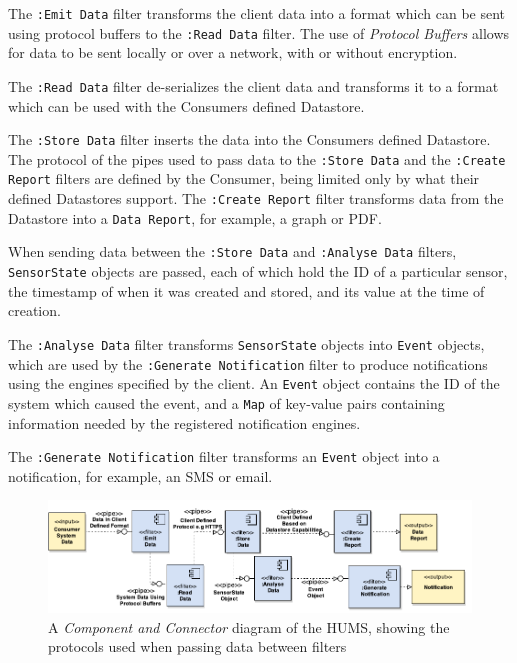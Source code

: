\documentclass[10pt,a4paper]{article}
\begin{document}
The \texttt{:Emit Data} filter transforms the client data into a format which can be sent using protocol buffers to the \texttt{:Read Data} filter. The use of \emph{Protocol Buffers} allows for data to be sent locally or over a network, with or without encryption. 

The \texttt{:Read Data} filter de-serializes the client data and transforms it to a format which can be used with the Consumers defined Datastore. 

The \texttt{:Store Data} filter inserts the data into the Consumers defined Datastore.
The protocol of the pipes used to pass data to the \texttt{:Store Data} and the \texttt{:Create Report} filters are defined by the Consumer, being limited only by what their defined Datastores support.
The \texttt{:Create Report} filter transforms data from the Datastore into a \texttt{Data Report}, for example, a graph or PDF.

When sending data between the \texttt{:Store Data} and \texttt{:Analyse Data} filters, \texttt{SensorState} objects are passed, each of which hold the ID of a particular sensor, the timestamp of when it was created and stored, and its value at the time of creation. 

The \texttt{:Analyse Data} filter transforms \texttt{SensorState} objects into \texttt{Event} objects, which are used by the \texttt{:Generate Notification} filter to produce notifications using the engines specified by the client.
An \texttt{Event} object contains the ID of the system which caused the event, and a \texttt{Map} of key-value pairs containing information needed by the registered notification engines.

The \texttt{:Generate Notification} filter transforms an \texttt{Event} object into a notification, for example, an SMS or email. 

\begin{figure}[tbp]
  \includegraphics[width=\textwidth]{images/pipesAndFilters.pdf}
  \caption{A \emph{Component and Connector} diagram of the HUMS, showing the protocols used when passing data between filters}
  \label{fig:pipesAndFilter}
\end{figure}
\end{document}
